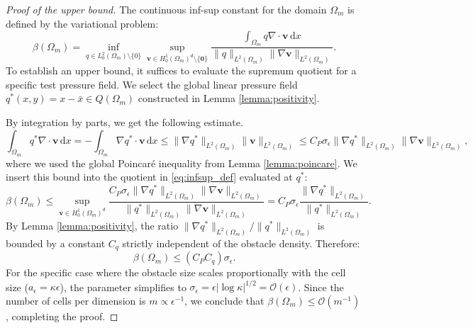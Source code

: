 \documentclass{elsarticle}
\begin{document}
\begin{proof}[Proof of the upper bound]
    The continuous inf-sup constant for the domain $\Omega_m$ is defined by the variational problem:
    \begin{equation} \label{eq:infsup_def_cp}
        \beta(\Omega_m) = \inf_{q \in L_0^2(\Omega_m) \setminus \{0\}} \sup_{\mathbf{v} \in H_0^1(\Omega_m)^d \setminus \{\mathbf{0}\}} \frac{\int_{\Omega_m} q \nabla \cdot \mathbf{v} \, \mathrm{d}x}{\|q\|_{L^2(\Omega_m)} \|\nabla \mathbf{v}\|_{L^2(\Omega_m)}}.
    \end{equation}
    To establish an upper bound, it suffices to evaluate the supremum quotient for a specific test pressure field. We select the global linear pressure field $q^*(x, y) = x - \bar{x} \in Q(\Omega_m)$ constructed in Lemma \ref{lemma:positivity}.

    By integration by parts, we get the following estimate.
    \begin{equation}
        \int_{\Omega_m} q^* \nabla \cdot \mathbf{v} \, \mathrm{d}x = -\int_{\Omega_m} \nabla q^* \cdot \mathbf{v} \, \mathrm{d}x \le \|\nabla q^*\|_{L^2(\Omega_m)} \|\mathbf{v}\|_{L^2(\Omega_m)} \le C_P \sigma_{\epsilon} \|\nabla q^*\|_{L^2(\Omega_m)} \|\nabla \mathbf{v}\|_{L^2(\Omega_m)},
    \end{equation}
    where we used the global Poincaré inequality from Lemma \ref{lemma:poincare}.
    We insert this bound into the quotient in \eqref{eq:infsup_def} evaluated at $q^*$:
    \begin{equation}
        \beta(\Omega_m) \le \sup_{\mathbf{v} \in H_0^1(\Omega_m)^d} \frac{C_P \sigma_{\epsilon} \|\nabla q^*\|_{L^2(\Omega_m)} \|\nabla \mathbf{v}\|_{L^2(\Omega_m)}}{\|q^*\|_{L^2(\Omega_m)} \|\nabla \mathbf{v}\|_{L^2(\Omega_m)}} = C_P \sigma_{\epsilon} \frac{\|\nabla q^*\|_{L^2(\Omega_m)}}{\|q^*\|_{L^2(\Omega_m)}}.
    \end{equation}
    By Lemma \ref{lemma:positivity}, the ratio $\|\nabla q^*\|_{L^2(\Omega_m)} / \|q^*\|_{L^2(\Omega_m)}$ is bounded by a constant $C_q$ strictly independent of the obstacle density. Therefore:
    \begin{equation}
        \beta(\Omega_m) \le (C_P C_q) \sigma_{\epsilon}.
    \end{equation}
    For the specific case where the obstacle size scales proportionally with the cell size ($a_{\epsilon} = \kappa \epsilon$), the parameter simplifies to $\sigma_{\epsilon} = \epsilon |\log \kappa|^{1/2} = \mathcal{O}(\epsilon)$. Since the number of cells per dimension is $m \propto \epsilon^{-1}$, we conclude that $\beta(\Omega_m) \le \mathcal{O}(m^{-1})$, completing the proof.
\end{proof}
\end{document}
